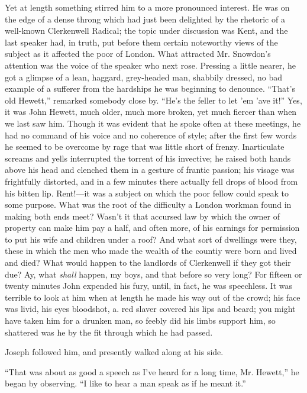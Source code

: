 Yet at length something stirred him to a more pronounced interest. He
was on the edge of a dense throng which had just been delighted by the
rhetoric of a well-known Clerkenwell Radical; the topic under discussion
was Kent, and the last speaker had, in truth, put before them certain
noteworthy views of the subject as it affected the poor of London. What
attracted Mr. Snowdon's attention was the voice of the speaker who next
rose. Pressing a little nearer, he got a glimpse of a lean, haggard,
grey-headed man, shabbily dressed, no bad example of a sufferer from the
hardships he was beginning to denounce. ``That's old Hewett,'' remarked
somebody close by. ``He's the feller to let 'em 'ave it!'' Yes, it was
John Hewett, much older, much more broken, yet much fiercer than when we
last saw him. Though it was evident that he spoke often at these
meetings, he had no command of his voice
{\protect\hypertarget{152}{}{}}and no coherence of style; after the
first few words he seemed to be overcome by rage that was little short
of frenzy. Inarticulate screams and yells interrupted the torrent of his
invective; he raised both hands above his head and clenched them in a
gesture of frantic passion; his visage was frightfully distorted, and in
a few minutes there actually fell drops of blood from his bitten lip.
Rent!---it was a subject on which the poor fellow could speak to some
purpose. What was the root of the difficulty a London workman found in
making both ends meet? Wasn't it that accursed law by which the owner of
property can make him pay a half, and often more, of his earnings for
permission to put his wife and children under a roof? And what sort of
dwellings were they, these in which the men who made the wealth of the
countiy were born and lived and died? What would happen to the landlords
of Clerkenwell if they got their due? Ay, what \emph{shall} happen, my
boys, and that before so very long? For fifteen or twenty minutes John
expended his {\protect\hypertarget{153}{}{}}fury, until, in fact, he was
speechless. It was terrible to look at him when at length he made his
way out of the crowd; his face was livid, his eyes bloodshot, a. red
slaver covered his lips and beard; you might have taken him for a
drunken man, so feebly did his limbs support him, so shattered was he by
the fit through which he had passed.

Joseph followed him, and presently walked along at his side.

``That was about as good a speech as I've heard for a long time, Mr.
Hewett,'' he began by observing. ``I like to hear a man speak as if he
meant it.''

